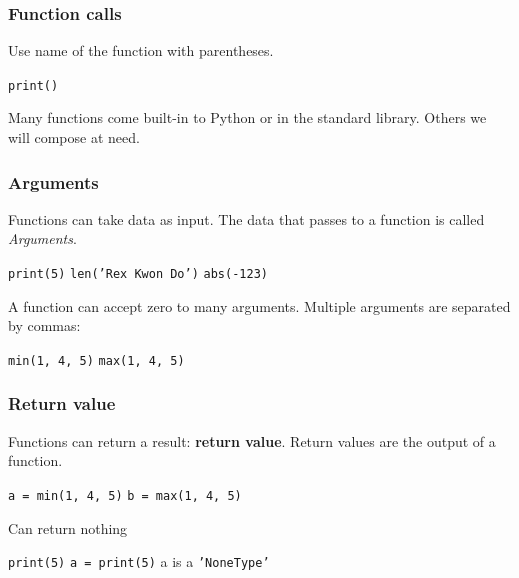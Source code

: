 \documentclass[11pt]{beamer}
\begin{document}
\begin{frame}
  \frametitle{Function calls}
  \Enlarge

  \begin{itemize}
  \myitem  Use name of the function with parentheses.
    \begin{itemize}
    \mysubitem  \texttt{print()}
    \end{itemize} \pause
  \myitem  Many functions come built-in to Python or in the standard library. \pause
  \myitem  Others we will compose at need.
  \end{itemize}
\end{frame}


\begin{frame}
  \frametitle{Arguments}
  \Enlarge

  \begin{itemize}
  \myitem  Functions can take data as input. \pause
  \myitem  The data that passes to a function is called \emph{Arguments}. \pause
    \begin{itemize}
    \mysubitem  \texttt{print(\textcolor{CS101GradBot}{5})} \pause
    \mysubitem  \texttt{len(\textcolor{CS101GradBot}{'Rex Kwon Do'})} \pause
    \mysubitem  \texttt{abs(\textcolor{CS101GradBot}{-123})} \pause
    \end{itemize}
  \myitem  A function can accept zero to many arguments. \pause
  \myitem  Multiple arguments are separated by commas:
    \begin{itemize}
    \mysubitem  \texttt{min(\textcolor{CS101GradBot}{1, 4, 5})}
    \mysubitem  \texttt{max(\textcolor{CS101GradBot}{1, 4, 5})}
    \end{itemize}
  \end{itemize}
\end{frame}

\begin{frame}
  \frametitle{Return value}
  \Enlarge

  \begin{itemize}
  \myitem  Functions can return a result: {\bf return value}. \pause
  \myitem  Return values are the output of a function. \pause
  \begin{itemize}
    \mysubitem  \texttt{a = min(1, 4, 5)}
    \mysubitem  \texttt{b = max(1, 4, 5)} \pause
  \end{itemize}
  \myitem Can return nothing 
  \begin{itemize}
    \mysubitem  \texttt{print(5)} \pause
    \mysubitem  \texttt{a = print(5)} \pause
    \mysubitem a is a \texttt{'\textcolor{CS101GradBot}{NoneType}'}
  \end{itemize} 
  \end{itemize}
\end{frame}
\end{document}
